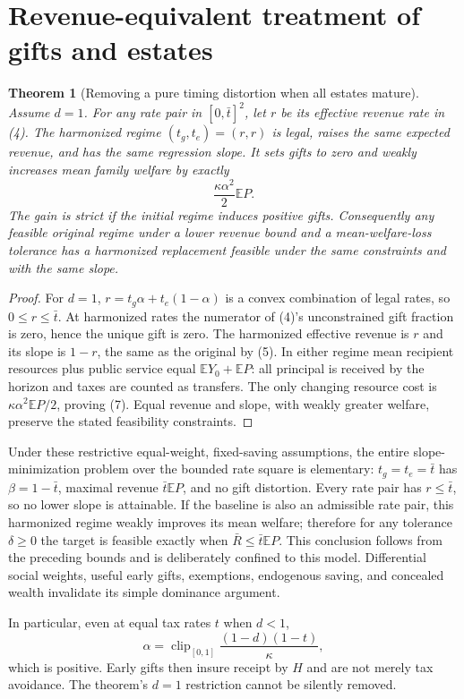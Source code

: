 \documentclass[11pt]{article}
\newtheorem{theorem}{Theorem}
\theoremstyle{remark}
\newcommand{\E}{\mathbb E}
\newcommand{\clip}{\operatorname{clip}}
\begin{document}
\section{Revenue-equivalent treatment of gifts and estates}
\begin{theorem}[Removing a pure timing distortion when all estates mature]
Assume $d=1$. For any rate pair in $[0,\bar t]^2$, let $r$ be its effective
revenue rate in (4). The harmonized regime $(t_g,t_e)=(r,r)$ is legal,
raises the same expected revenue, and has the same regression slope.
It sets gifts to zero and weakly increases mean family welfare by exactly
\[
 \frac{\kappa\alpha^2}{2}\E P. \tag{7}
\]
The gain is strict if the initial regime induces positive gifts.
Consequently any feasible original regime under a lower revenue bound
and a mean-welfare-loss tolerance has a harmonized replacement feasible
under the same constraints and with the same slope.
\end{theorem}
\begin{proof}
For $d=1$, $r=t_g\alpha+t_e(1-\alpha)$ is a convex combination of legal
rates, so $0\leq r\leq\bar t$. At harmonized rates the numerator of
(4)'s unconstrained gift fraction is zero, hence the unique gift is zero.
The harmonized effective revenue is $r$ and its slope is $1-r$, the same
as the original by (5). In either regime mean recipient resources plus
public service equal $\E Y_0+\E P$: all principal is received by the
horizon and taxes are counted as transfers. The only changing resource
cost is $\kappa\alpha^2\E P/2$, proving (7). Equal revenue and slope,
with weakly greater welfare, preserve the stated feasibility constraints.
\end{proof}
Under these restrictive equal-weight, fixed-saving assumptions, the entire
slope-minimization problem over the bounded rate square is elementary:
$t_g=t_e=\bar t$ has $\beta=1-\bar t$, maximal revenue $\bar t\E P$,
and no gift distortion. Every rate pair has $r\leq\bar t$, so no lower
slope is attainable. If the baseline is also an admissible rate pair,
this harmonized regime weakly improves its mean welfare; therefore for
any tolerance $\delta\geq0$ the target is feasible exactly when
$\bar R\leq\bar t\E P$. This conclusion follows from the preceding
bounds and is deliberately confined to this model. Differential social
weights, useful early gifts, exemptions, endogenous saving, and concealed
wealth invalidate its simple dominance argument.

In particular, even at equal tax rates $t$ when $d<1$,
\[
 \alpha=\clip_{[0,1]}\frac{(1-d)(1-t)}\kappa,
\]
which is positive. Early gifts then insure receipt by $H$ and are not
merely tax avoidance. The theorem's $d=1$ restriction cannot be silently
removed.
\end{document}
